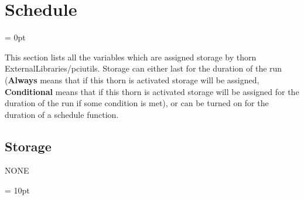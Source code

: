 
\section{Schedule} 


\parskip = 0pt


\noindent This section lists all the variables which are assigned storage by thorn ExternalLibraries/pciutils.  Storage can either last for the duration of the run ({\bf Always} means that if this thorn is activated storage will be assigned, {\bf Conditional} means that if this thorn is activated storage will be assigned for the duration of the run if some condition is met), or can be turned on for the duration of a schedule function.


\subsection*{Storage}NONE

\vspace{5mm}\parskip = 10pt 
